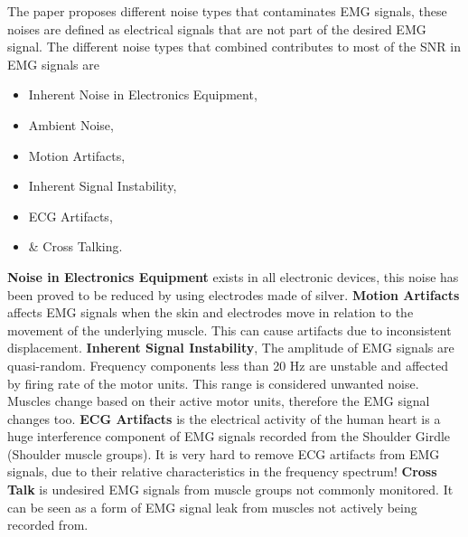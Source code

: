 \documentclass[../main.tex]{subfiles}
\begin{document}
The paper \cite{Tech2015} proposes different noise types that contaminates EMG signals, these noises are defined as electrical signals that are not part of the desired EMG signal.
The different noise types that combined contributes to most of the \gls{SNR} in EMG signals are
\begin{itemize}
\item Inherent Noise in Electronics Equipment,
\item Ambient Noise,
\item Motion Artifacts,
\item Inherent Signal Instability,
\item \gls{ECG} Artifacts,
\item \& Cross Talking.
\end{itemize}

\textbf{Noise in Electronics Equipment} exists in all electronic devices, this noise has been proved to be reduced by using electrodes made of silver.
\textbf{Motion Artifacts} affects EMG signals when the skin and electrodes move in relation to the movement of the underlying muscle.
This can cause artifacts due to inconsistent displacement.
\textbf{Inherent Signal Instability}, The amplitude of EMG signals are quasi-random. Frequency components less than 20 Hz are unstable and affected by firing rate of the motor units. This range is considered unwanted noise. Muscles change based on their active motor units, therefore the EMG signal changes too.
\textbf{ECG Artifacts} is the electrical activity of the human heart is a huge interference component of EMG signals recorded from the Shoulder Girdle (Shoulder muscle groups).
It is very hard to remove ECG artifacts from EMG signals, due to their relative characteristics in the frequency spectrum!
\textbf{Cross Talk} is undesired EMG signals from muscle groups not commonly monitored.
It can be seen as a form of EMG signal leak from muscles not actively being recorded from.

\end{document}
